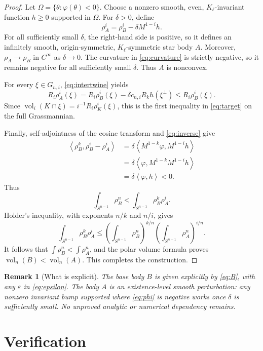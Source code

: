\documentclass[11pt]{article}
\newtheorem{remark}{Remark}
\newcommand{\vol}{\operatorname{vol}}
\newcommand{\ip}[2]{\left\langle #1,#2\right\rangle}
\begin{document}
\begin{proof}
Let $\Omega=\{\theta:\varphi(\theta)<0\}$.  Choose a nonzero smooth,
even, $K_\ell$-invariant function $h\geq0$ supported in $\Omega$.
For $\delta>0$, define
\begin{equation}\label{eq:A}
 \rho_A^i=\rho_B^i-\delta M^{1-i}h.
\end{equation}
For all sufficiently small $\delta$, the right-hand side is positive, so it
defines an infinitely smooth, origin-symmetric, $K_\ell$-symmetric star body
$A$.  Moreover, $\rho_A\to\rho_B$ in $C^\infty$ as $\delta\to0$.
The curvature in \eqref{eq:curvature} is strictly negative, so it remains
negative for all sufficiently small $\delta$.  Thus $A$ is nonconvex.

For every $\xi\in G_{n,i}$, \eqref{eq:intertwine} yields
\[
 R_i\rho_A^i(\xi)
 =R_i\rho_B^i(\xi)-\delta c_{n,i}R_kh(\xi^\perp)
 \leq R_i\rho_B^i(\xi).
\]
Since $\vol_i(K\cap\xi)=i^{-1}R_i\rho_K^i(\xi)$, this is the first
inequality in \eqref{eq:target} on the full Grassmannian.

Finally, self-adjointness of the cosine transform and
\eqref{eq:inverse} give
\begin{align*}
 \ip{\rho_B^k}{\rho_B^i-\rho_A^i}
 &=\delta\ip{M^{1-k}\varphi}{M^{1-i}h}\\
 &=\delta\ip{\varphi}{M^{1-k}M^{1-i}h}\\
 &=\delta\ip{\varphi}{h}<0.
\end{align*}
Thus
\[
 \int_{S^{n-1}}\rho_B^n
 <\int_{S^{n-1}}\rho_B^k\rho_A^i.
\]
Holder's inequality, with exponents $n/k$ and $n/i$, gives
\[
 \int_{S^{n-1}}\rho_B^k\rho_A^i
 \leq
 \left(\int_{S^{n-1}}\rho_B^n\right)^{k/n}
 \left(\int_{S^{n-1}}\rho_A^n\right)^{i/n}.
\]
It follows that $\int\rho_B^n<\int\rho_A^n$, and the polar volume
formula proves $\vol_n(B)<\vol_n(A)$.  This completes the construction.
\end{proof}

\begin{remark}[What is explicit]
The base body $B$ is given explicitly by \eqref{eq:B}, with any
$\varepsilon$ in \eqref{eq:epsilon}.  The body $A$ is an existence-level
smooth perturbation: any nonzero invariant bump supported where
\eqref{eq:phi} is negative works once $\delta$ is sufficiently small.
No unproved analytic or numerical dependency remains.
\end{remark}

\section{Verification}
\end{document}
